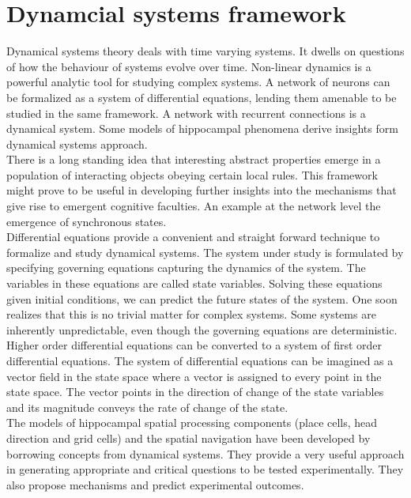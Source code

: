
\section{Dynamcial systems framework}
\label{dynamics}



Dynamical systems theory deals with time varying systems. It dwells on questions of how the behaviour of systems evolve over time. Non-linear dynamics is a powerful analytic tool for studying complex systems. A network of neurons can be formalized as a system of differential equations, lending them amenable to be studied in the same framework. A network with recurrent connections is a dynamical system. Some models of hippocampal phenomena derive insights form dynamical systems approach. \\
There is a long standing idea that interesting abstract properties emerge in a population of interacting objects obeying certain local rules. This framework might prove to be useful in developing further insights into the mechanisms that give rise to emergent cognitive faculties. An example at the network level the emergence of synchronous states.\\
Differential equations provide a convenient and straight forward technique to formalize and study dynamical systems. The system under study is formulated by specifying governing equations capturing the dynamics of the system. The variables in these equations are called state variables. Solving these equations given initial conditions, we can predict the future states of the system. One soon realizes that this is no trivial matter for complex systems. Some systems are inherently unpredictable, even though the governing equations are deterministic. Higher order differential equations can be converted to a system of first order differential equations. The system of differential equations can be imagined as a vector field in the state space where a vector is assigned to every point in the state space. The vector points in the direction of change of the state variables and its magnitude conveys the rate of change of the state. \\

The models of hippocampal spatial processing components (place cells, head direction and grid cells) and the spatial navigation have been developed by borrowing concepts from dynamical systems. They provide a very useful approach in generating appropriate and critical questions to be tested experimentally. They also propose mechanisms and predict experimental outcomes. 
 
